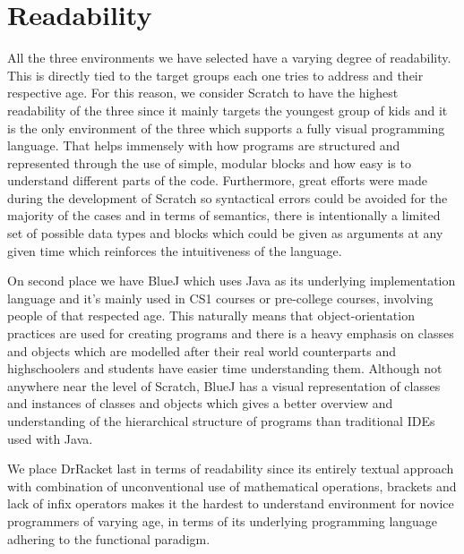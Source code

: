 \section{Readability}
\label{sec:readability}
All the three environments we have selected have a varying degree of readability. This is directly tied to the target groups each one tries to address and their respective age. For this reason, we consider Scratch to have the highest readability of the three since it mainly targets the youngest group of kids and it is the only environment of the three which supports a fully visual programming language. That helps immensely with how programs are structured and represented through the use of simple, modular blocks and how easy is to understand different parts of the code. Furthermore, great efforts were made during the development of Scratch so syntactical errors could be avoided for the majority of the cases and in terms of semantics, there is intentionally a limited set of possible data types and blocks which could be given as arguments at any given time which reinforces the intuitiveness of the language. 

On second place we have BlueJ which uses Java as its underlying implementation language and it's mainly used in CS1 courses or pre-college courses, involving people of that respected age. This naturally means that object-orientation practices are used for creating programs and there is a heavy emphasis on classes and objects which are modelled after their real world counterparts and highschoolers and students have easier time understanding them. Although not anywhere near the level of Scratch, BlueJ has a visual representation of classes and instances of classes and objects which gives a better overview and understanding of the hierarchical structure of programs than traditional IDEs used with Java. 

We place DrRacket last in terms of readability since its entirely textual approach with combination of unconventional use of mathematical operations, brackets and lack of infix operators makes it the hardest to understand environment for novice programmers of varying age, in terms of its underlying programming language adhering to the functional paradigm.

